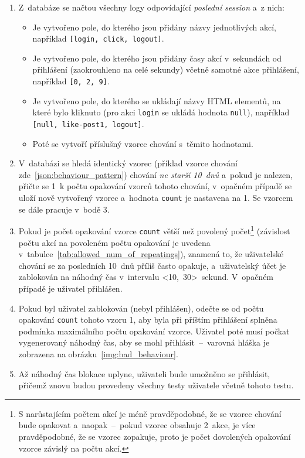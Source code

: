 \begin{enumerate}
  \item Z~databáze se načtou všechny logy odpovídající \textit{poslední session} a~z nich:
  \begin{itemize}
      \item Je vytvořeno pole, do kterého jsou přidány názvy jednotlivých akcí, například \texttt{[login,~click,~logout]}.
      \item Je vytvořeno pole, do kterého jsou přidány časy akcí v~sekundách od přihlášení (zaokrouhleno na celé sekundy) včetně samotné akce přihlášení, například \texttt{[0,~2,~9]}.
      \item Je vytvořeno pole, do kterého se ukládají názvy HTML elementů, na které bylo kliknuto (pro akci \texttt{login} se ukládá hodnota \texttt{null}), například
      \\ \texttt{[null,~like-post1,~logout]}.
      \item Poté se vytvoří příslušný vzorec chování s~těmito hodnotami.
  \end{itemize}
  \item V~databázi se hledá identický vzorec (příklad vzorce chování zde~\ref{json:behaviour_pattern}) chování \textit{ne starší 10~dnů} a~pokud je nalezen, přičte se 1~k počtu opakování vzorců tohoto chování, v~opačném případě se uloží nově vytvořený vzorec a~hodnota \texttt{count} je nastavena na 1. Se vzorcem se dále pracuje v~bodě 3.
  \item Pokud je počet opakování vzorce \texttt{count} větší než povolený počet\footnote{S narůstajícím počtem akcí je méně pravděpodobné, že se vzorec chování bude opakovat a~naopak~--~pokud vzorec obsahuje 2~akce, je více pravděpodobné, že se vzorec zopakuje, proto je počet dovolených opakování vzorce závislý na počtu akcí.} (závislost počtu akcí na povoleném počtu opakování je uvedena v~tabulce~\ref{tab:allowed_num_of_repeatings}), znamená to, že uživatelské chování se za posledních 10~dnů příliš často opakuje, a~uživatelský účet je zablokován na náhodný čas v~intervalu <10,~30>~sekund. V~opačném případě je uživatel přihlášen.
  \item Pokud byl uživatel zablokován (nebyl přihlášen), odečte se od počtu opakování \texttt{count} tohoto vzoru 1, aby byla při příštím přihlášení splněna podmínka maximálního počtu opakování vzorce. Uživatel poté musí počkat vygenerovaný náhodný čas, aby se mohl přihlásit~--~varovná hláška je zobrazena na obrázku~\ref{img:bad_behaviour}.
  \item Až náhodný čas blokace uplyne, uživateli bude umožněno se přihlásit, přičemž znovu budou provedeny všechny testy uživatele včetně tohoto testu.
\end{enumerate}

